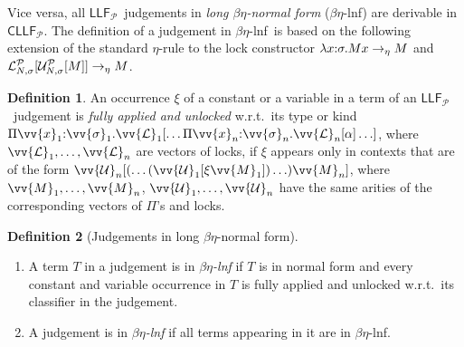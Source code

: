 \documentclass[submission,copyright,creativecommons]{eptcs}
\theoremstyle{plain}
\theoremstyle{definition}
\newtheorem{definition}{Definition}[section]
\newcommand{\LLFP}  {\mbox{$\mathsf{LLF}_{\mathcal P}$}}
\newcommand{\CLLFP} {\mbox{$\mathsf{CLLF}_{\mathcal P}$}}
\newcommand {\wrt}       {{\textrm{w}.\textrm{r}.\textrm{t}.}}
\newcommand {\Lock}   [4] {{\mathcal{L}}^{#1}_{#2, #3}[{#4}]} \newcommand {\LockC} [3] {{\mathcal{L}}^{#1}_{#2}      [{#3}]}
\renewcommand {\P} {\mathcal{P}} \newcommand {\Q} {\mathcal{Q}}
\newcommand {\ELNF}  {$\beta\eta$-lnf}   \newcommand {\Subst} {{\mathcal S}}
\begin{document}
Vice versa, all \LLFP\ judgements in \emph{long $\beta\eta$-normal
  form} (\ELNF) are derivable in \CLLFP.  The definition of a
judgement in \ELNF\ is based on the following extension of the
standard $\eta$-rule to the lock constructor
$\lambda x{:} \sigma. Mx \rightarrow_{\eta} M$ and
$\Lock{\P}{N}{\sigma}{\Unlock{\P}{N}{\sigma}{M}} \rightarrow_{\eta} M
$.
\begin{definition}
  An occurrence $\xi$ of a constant or a variable in a term of an
  \LLFP\ judgement is \emph{fully applied and unlocked} \wrt\ its type
  or kind
  $\Prod{\vv{x}_1}{\vv{\sigma}_1}{\vv{\cal L}_1[\ldots
    \Prod{\vv{x}_n}{\vv{\sigma}_n}{\vv{\cal L}_n [\alpha]} \ldots ]
  }$,
  where $\vv{\cal L}_1, \ldots , \vv{\cal L}_n$ are vectors of locks,
  if $\xi$ appears only in contexts that are of the form
  $\vv{\cal U}_n [ (\ldots (\vv{\cal U}_1[\xi \vv{M}_1])\ldots )
  \vv{M}_n]$, where
$\vv{M}_1, \ldots, \vv{M}_n$,
  $ \vv{\cal U}_1, \ldots , \vv{\cal U}_n$ have the same arities of
  the corresponding vectors of $\Pi$'s and locks.
\end{definition}
\begin{definition}[Judgements in long $\beta\eta$-normal form]
  \hfill \label{def:etaexp}\vspace{-0.5ex}
  \begin{enumerate}
  \setlength\itemsep{-0.3ex}
  \item A term $T$ in a judgement is in \emph{\ELNF} if $T$ is in
    normal form and every constant and variable occurrence in $T$ is
    fully applied and unlocked \wrt\ its classifier in the judgement.
  \item A judgement is in \emph{\ELNF} if all terms appearing in it are
    in \ELNF.
  \end{enumerate}
\end{definition}
\end{document}
